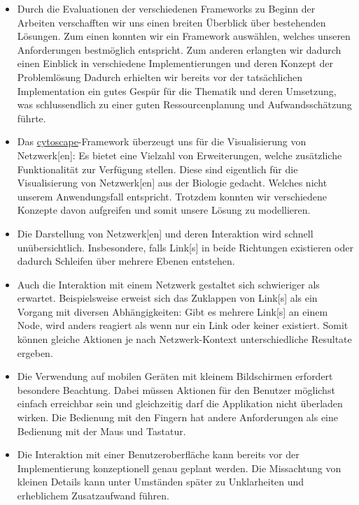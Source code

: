 \begin{itemize}
    \item Durch die Evaluationen der verschiedenen \gls{Framework}s zu Beginn der Arbeiten verschafften wir uns einen breiten Überblick über bestehenden Lösungen. Zum einen konnten wir ein \gls{Framework} auswählen, welches unseren Anforderungen bestmöglich entspricht. Zum anderen erlangten wir dadurch einen Einblick in verschiedene Implementierungen und deren Konzept der Problemlösung
    Dadurch erhielten wir bereits vor der tatsächlichen Implementation ein gutes Gespür für die Thematik und deren Umsetzung, was schlussendlich zu einer guten Ressourcenplanung und Aufwandsschätzung führte. 
    \item Das \hyperref[cytoscape]{cytoscape}-\gls{Framework} überzeugt uns für die Visualisierung von \gls{Netzwerk}[en]: Es bietet eine Vielzahl von Erweiterungen, welche zusätzliche Funktionalität zur Verfügung stellen. Diese sind eigentlich für die Visualisierung von \gls{Netzwerk}[en] aus der Biologie %
    gedacht. Welches nicht unserem Anwendungsfall entspricht. Trotzdem konnten wir verschiedene Konzepte davon aufgreifen und somit unsere Lösung zu modellieren. 
    \item Die Darstellung von \gls{Netzwerk}[en] und deren Interaktion wird schnell unübersichtlich. Insbesondere, falls \gls{Link}[s] in beide Richtungen existieren oder dadurch Schleifen über mehrere Ebenen entstehen.
    \item Auch die Interaktion mit einem \gls{Netzwerk} gestaltet sich schwieriger als erwartet. Beispielsweise erweist sich das Zuklappen von \gls{Link}[s] als ein Vorgang mit diversen Abhängigkeiten: Gibt es mehrere \gls{Link}[s] an einem \gls{Node}, wird anders reagiert als wenn nur ein \gls{Link} oder keiner existiert. Somit können gleiche Aktionen je nach \gls{Netzwerk}-Kontext unterschiedliche Resultate ergeben.
    \item Die Verwendung auf mobilen Geräten mit kleinem Bildschirmen erfordert besondere Beachtung. Dabei müssen Aktionen für den Benutzer möglichst einfach erreichbar sein und gleichzeitig darf die Applikation nicht überladen wirken. Die Bedienung mit den Fingern hat andere Anforderungen als eine Bedienung mit der Maus und Tastatur.
    \item Die Interaktion mit einer Benutzeroberfläche kann bereits vor der Implementierung konzeptionell genau geplant werden. Die Missachtung von kleinen Details kann unter Umständen später zu Unklarheiten und erheblichem Zusatzaufwand führen.
\end{itemize}

